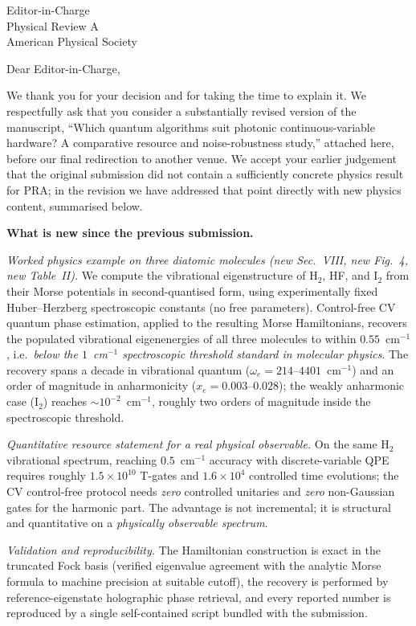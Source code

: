 \documentclass[11pt]{letter}
\begin{document}
\begin{letter}{Editor-in-Charge \\ Physical Review A \\ American Physical
Society}

\opening{Dear Editor-in-Charge,}

We thank you for your decision and for taking the time to explain it. We
respectfully ask that you consider a substantially revised version of the
manuscript, ``Which quantum algorithms suit photonic continuous-variable
hardware? A comparative resource and noise-robustness study,'' attached
here, before our final redirection to another venue. We accept your
earlier judgement that the original submission did not contain a
sufficiently concrete physics result for PRA; in the revision we have
addressed that point directly with new physics content, summarised below.

\textbf{What is new since the previous submission.}

\textit{Worked physics example on three diatomic molecules
(new Sec.~VIII, new Fig.~4, new Table~II).} We compute the
vibrational eigenstructure of H$_2$, HF, and I$_2$ from their
Morse potentials in second-quantised form, using experimentally fixed
Huber--Herzberg spectroscopic constants (no free parameters). Control-free
CV quantum phase estimation, applied to the resulting Morse Hamiltonians,
recovers the populated vibrational eigenenergies of all three molecules
to within $0.55$~cm$^{-1}$, i.e.\ \emph{below the $1$~cm$^{-1}$
spectroscopic threshold standard in molecular physics}.  The recovery
spans a decade in vibrational quantum ($\omega_e=214$--$4401$~cm$^{-1}$)
and an order of magnitude in anharmonicity ($x_e=0.003$--$0.028$); the
weakly anharmonic case (I$_2$) reaches $\sim 10^{-2}$~cm$^{-1}$,
roughly two orders of magnitude inside the spectroscopic threshold.

\textit{Quantitative resource statement for a real physical observable.}
On the same H$_2$ vibrational spectrum, reaching $0.5$~cm$^{-1}$
accuracy with discrete-variable QPE requires roughly $1.5\times10^{10}$
T-gates and $1.6\times10^4$ controlled time evolutions; the
CV control-free protocol needs \emph{zero} controlled unitaries and
\emph{zero} non-Gaussian gates for the harmonic part. The advantage is
not incremental; it is structural and quantitative on a
\emph{physically observable spectrum}.

\textit{Validation and reproducibility.} The Hamiltonian construction
is exact in the truncated Fock basis (verified eigenvalue agreement
with the analytic Morse formula to machine precision at suitable
cutoff), the recovery is performed by reference-eigenstate
holographic phase retrieval, and every reported number is reproduced
by a single self-contained script bundled with the submission.


\end{letter}
\end{document}
